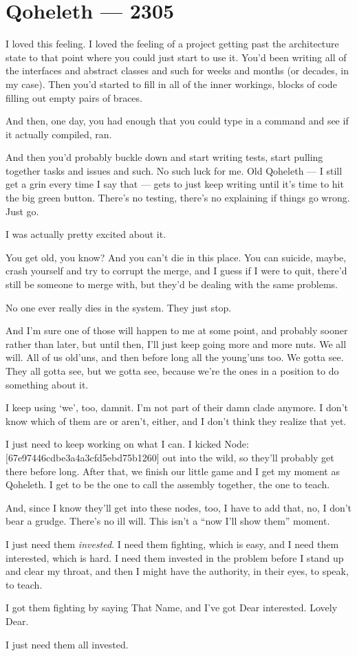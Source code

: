 \hypertarget{qoheleth-2305}{%
\chapter*{Qoheleth — 2305}\label{qoheleth-2305}}

I loved this feeling. I loved the feeling of a project getting past the architecture state to that point where you could just start to use it. You'd been writing all of the interfaces and abstract classes and such for weeks and months (or decades, in my case). Then you'd started to fill in all of the inner workings, blocks of code filling out empty pairs of braces.

And then, one day, you had enough that you could type in a command and see if it actually compiled, ran.

And then you'd probably buckle down and start writing tests, start pulling together tasks and issues and such. No such luck for me. Old Qoheleth — I still get a grin every time I say that — gets to just keep writing until it's time to hit the big green button. There's no testing, there's no explaining if things go wrong. Just go.

I was actually pretty excited about it.

You get old, you know? And you can't die in this place. You can suicide, maybe, crash yourself and try to corrupt the merge, and I guess if I were to quit, there'd still be someone to merge with, but they'd be dealing with the same problems.

No one ever really dies in the system. They just stop.

And I'm sure one of those will happen to me at some point, and probably sooner rather than later, but until then, I'll just keep going more and more nuts. We all will. All of us old'uns, and then before long all the young'uns too. We gotta see. They all gotta see, but we gotta see, because we're the ones in a position to do something about it.

I keep using `we', too, damnit. I'm not part of their damn clade anymore. I don't know which of them are or aren't, either, and I don't think they realize that yet.

I just need to keep working on what I can. I kicked Node: {[}67e97446cdbe3a4a3cfd5ebd75b1260{]} out into the wild, so they'll probably get there before long. After that, we finish our little game and I get my moment as Qoheleth. I get to be the one to call the assembly together, the one to teach.

And, since I know they'll get into these nodes, too, I have to add that, no, I don't bear a grudge. There's no ill will. This isn't a ``now I'll show them'' moment.

I just need them \emph{invested}. I need them fighting, which is easy, and I need them interested, which is hard. I need them invested in the problem before I stand up and clear my throat, and then I might have the authority, in their eyes, to speak, to teach.

I got them fighting by saying That Name, and I've got Dear interested. Lovely Dear.

I just need them all invested.
